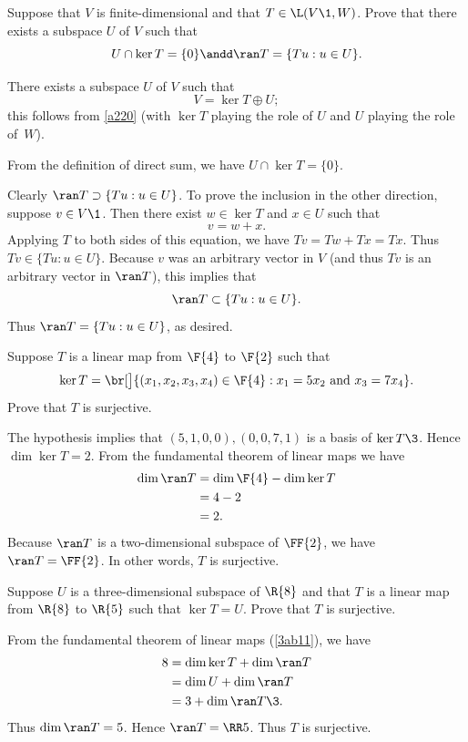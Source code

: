 \exercise
Suppose that $V$ is finite-dimensional and that $T \in \L(V\1,W)$.  Prove that
there exists a subspace $U$ of $V$ such that
\[
U \cap \ker T = \{0\} \andd \ran T = \{Tu:u\in U\}.
\]
\exercisedisplayend

\begin{Solution}
There exists a subspace $U$ of $V$ such that
\[
V = \ker T \oplus U;
\]
this follows from \ref{a220} (with $\ker T$ playing the role of $U$ and $U$ playing
the role of~$W$).

{}From the definition of direct sum, we have $U \cap \ker T = \{0\}$.

Clearly $\ran T \supset \{Tu:u\in U\}$.  To prove the inclusion in the other
direction, suppose $v \in V\1$.  Then there exist $w \in \ker T$ and $x \in U$ such
that
\[
v = w + x.
\]
Applying $T$ to both sides of this equation, we have $Tv = Tw + Tx = Tx$.  Thus
$Tv \in \{Tu:u\in U\}$.  Because $v$ was an arbitrary vector in $V$ (and thus $Tv$
is an arbitrary vector in $\ran T$), this implies that
\[
\ran T \subset \{Tu:u \in U\}.
\]
Thus $\ran T = \{Tu:u \in U\}$, as desired.
\end{Solution}

\exercise
Suppose $T$ is a linear map from $\F{4}$ to $\F{2}$ such that
\[
\ker T = \br[\big]{(x_1, x_2, x_3, x_4) \in \F{4}: x_1 = 5 x_2 \mbox{\ and\ } x_3 = 7 x_4 }.
\]
Prove that $T$ is surjective.

\begin{Solution}
The hypothesis implies that
$(5,1,0,0), (0,0,7,1)$ is a basis of $\ker T\3$. Hence
$\dim \ker T = 2$.  {}From the fundamental theorem of linear maps we have
\begin{align*}
\dim \ran T &= \dim \F{4} - \dim \ker T \\
&= 4 - 2 \\
&= 2.
\end{align*}
Because $\ran T$ is a two-dimensional subspace of $\FF{2}$, we have
$\ran T = \FF{2}$.  In other words, $T$ is surjective.
\end{Solution}

\exercise
Suppose $U$ is a three-dimensional subspace of $\R{8}$ and that $T$ is a linear
map from $\R{8}$ to $\R{5}$ such that $\ker  T  = U$.  Prove that $T$
is  surjective.

\begin{Solution}
From the fundamental theorem of linear maps (\ref{3ab11}), we have
\begin{align*}
8 &= \dim \ker T + \dim \ran T \\
&= \dim U + \dim \ran T \\
&= 3 + \dim \ran T\3.
\end{align*}
Thus $\dim \ran T = 5$. Hence $\ran T = \RR5$. Thus $T$ is surjective.
\end{Solution}

